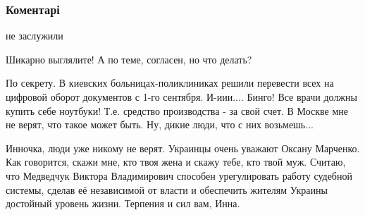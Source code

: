  
 
 
 
 
\subsubsection{Коментарі}

\begin{itemize}
 
не заслужили

 
Шикарно выглялите! А по теме, согласен, но что делать?

 

По секрету. В киевских больницах-поликлиниках решили перевести всех на цифровой
оборот документов с 1-го сентября. И-иии.... Бинго! Все врачи должны купить
себе ноутбуки! Т.е. средство производства - за свой счет. В Москве мне не
верят, что такое может быть. Ну, дикие люди, что с них возьмешь...


 

Инночка, люди уже никому не верят. Украинцы очень уважают Оксану Марченко. Как
говорится, скажи мне, кто твоя жена и скажу тебе, кто твой муж. Считаю, что
Медведчук Виктора Владимирович способен урегулировать работу судебной системы,
сделав её независимой от власти и обеспечить жителям Украины достойный уровень
жизни. Терпения и сил вам, Инна.


\end{itemize}
